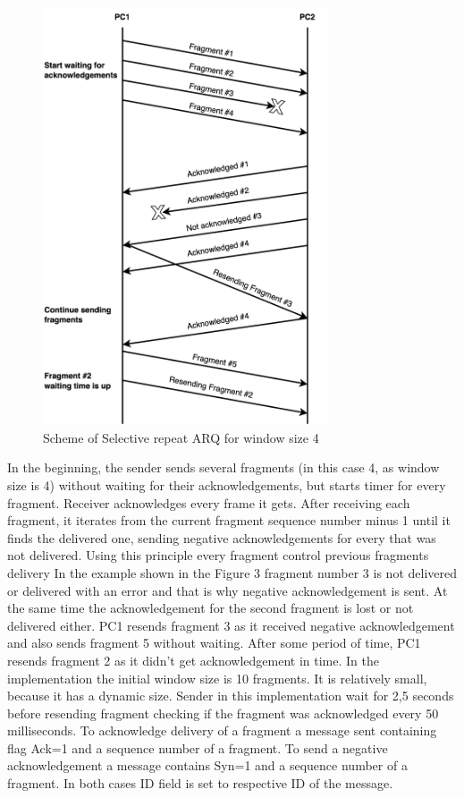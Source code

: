 \documentclass{article}
\begin{document}
\begin{figure}[!h]
    \centering
    \includegraphics[width=0.75\textwidth]{images/arq.png}
    \caption{Scheme of Selective repeat ARQ for window size 4}
    \label{fig:mesh1}
\end{figure}

In the beginning, the sender sends several fragments (in this case 4, as window size is 4) without waiting for their acknowledgements, but starts timer for every fragment.  Receiver acknowledges every frame it gets. After receiving each fragment, it iterates from the current fragment sequence number minus 1 until it finds the delivered one, sending negative acknowledgements for every that was not delivered. Using this principle every fragment control previous fragments delivery    In the example shown in the Figure 3 fragment number 3 is not delivered or delivered with an error and that is why negative acknowledgement is sent. At the same time the acknowledgement for the second fragment is lost or not delivered  either.  PC1 resends fragment 3 as it received negative acknowledgement and also sends fragment 5  without waiting. After some period of time, PC1 resends fragment 2 as it didn't get acknowledgement in time.\newline
In the implementation the initial window size is 10 fragments. It is relatively small, because it has a dynamic size. Sender in this implementation wait for 2,5 seconds before resending fragment checking if the fragment was acknowledged every 50 milliseconds.
\newline
To acknowledge delivery of a fragment a message sent containing flag Ack=1 and a sequence number of a fragment. To send a negative acknowledgement a message contains Syn=1 and a sequence number of a fragment. In both cases ID field is set to respective ID of the message.
\end{document}
